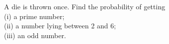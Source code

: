 A die is thrown once. Find the probability of getting\\
(i) a prime number;\\
(ii) a number lying between 2 and 6;\\
(iii) an odd number.
